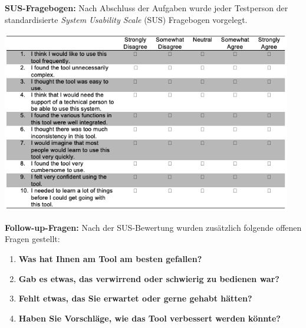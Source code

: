 \textbf{SUS-Fragebogen:}  
Nach Abschluss der Aufgaben wurde jeder Testperson der standardisierte \emph{System Usability Scale} (SUS) Fragebogen vorgelegt.

\begin{center}
    \includegraphics[width=0.95\textwidth]{graphics/sus_blank.png}
\end{center}

\textbf{Follow-up-Fragen:}  
Nach der SUS-Bewertung wurden zusätzlich folgende offenen Fragen gestellt:
\begin{enumerate}
    \item \textbf{Was hat Ihnen am Tool am besten gefallen?}
    \item \textbf{Gab es etwas, das verwirrend oder schwierig zu bedienen war?}
    \item \textbf{Fehlt etwas, das Sie erwartet oder gerne gehabt hätten?}
    \item \textbf{Haben Sie Vorschläge, wie das Tool verbessert werden könnte?}
\end{enumerate}
